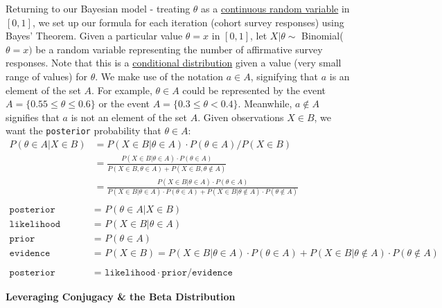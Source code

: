 Returning to our Bayesian model - treating $\theta$ as a \href{https://onlinecourses.science.psu.edu/stat414/node/88}{continuous random variable} in $[0,1]$, we set up our formula for each iteration (cohort survey responses) using Bayes' Theorem. Given a particular value $\theta = x$ in $[0,1]$, let $X|\theta \sim$ Binomial($\theta = x)$ be a random variable representing the number of affirmative survey responses. Note that this is a \href{https://en.wikipedia.org/wiki/Conditional_probability_distribution}{conditional distribution} given a value (very small range of values) for $\theta$. We make use of the notation $a \in A$, signifying that $a$ is an element of the set $A$. For example, $\theta \in A$ could be represented by the event $A = \{0.55 \le \theta \le 0.6\}$ or the event $A = \{0.3 \le \theta < 0.4\}$. Meanwhile, $a \not\in A$ signifies that $a$ is not an element of the set $A$. Given observations $X \in B$, we want the \texttt{posterior} probability that $\theta \in A$:
\begin{align*}
    P(\theta \in A | X \in B ) &= P(X \in B | \theta \in A) \cdot P(\theta \in A) / P(X \in B) \\
    &= \frac{P(X \in B | \theta \in A) \cdot P(\theta \in A)}{P(X \in B, \theta \in A) + P(X \in B, \theta \not\in A)} \\
    &= \frac{P(X \in B | \theta \in A) \cdot P(\theta \in A)}{P(X \in B | \theta \in A) \cdot P(\theta \in A) + P(X \in B | \theta \not\in A) \cdot P(\theta \not\in A)} \\
    \\
    \texttt{posterior } &\texttt{= } P(\theta \in A | X \in B ) \\
    \texttt{likelihood } &\texttt{= } P(X \in B | \theta \in A) \\
    \texttt{prior } &\texttt{= } P(\theta \in A) \\
    \texttt{evidence } &\texttt{= } P(X \in B) = P(X \in B | \theta \in A) \cdot P(\theta \in A) + P(X \in B | \theta \not\in A) \cdot P(\theta \not\in A) \\
    \\
    \texttt{posterior } &\texttt{= } \texttt{likelihood} \cdot \texttt{prior} / \texttt{evidence}
\end{align*}

\textbf{Leveraging Conjugacy \& the Beta Distribution}

